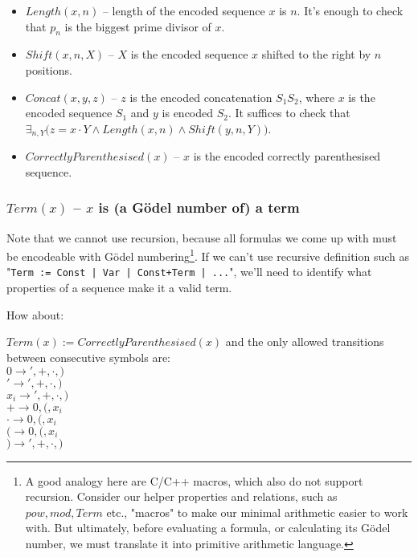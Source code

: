 \documentclass{article}
\begin{document}
\begin{itemize}
    \item $Length(x, n)$ -- length of the encoded sequence $x$ is $n$. It's enough to check that
        $p_n$ is the biggest prime divisor of $x$.
    \item $Shift(x, n, X)$ -- $X$ is the encoded sequence $x$ shifted to the right by $n$ positions.
    \item $Concat(x, y, z)$ -- $z$ is the encoded concatenation $S_1S_2$, where $x$ is the
        encoded sequence $S_1$ and $y$ is encoded $S_2$. It suffices to check that
        $\exists_{n, Y} \bigl( z = x \cdot Y \land Length(x, n) \land Shift(y, n, Y) \bigl)$.
    \item $CorrectlyParenthesised(x)$ -- $x$ is the encoded correctly parenthesised sequence.
\end{itemize}

\subsubsection{$Term(x)$ -- $x$ is (a Gödel number of) a term}

Note that we cannot use recursion, because all formulas
we come up with must be encodeable with Gödel numbering\footnote{
    A good analogy here are C/C++ macros, which also do not support recursion.
    Consider our helper properties and relations, such as $pow, mod, Term$ etc., "macros"
    to make our minimal arithmetic easier to work with. But ultimately, before evaluating
    a formula, or calculating its Gödel number, we must translate it into primitive
    arithmetic language.
}. If we can't use recursive definition such as "\texttt{Term := Const | Var | Const+Term | ...}",
we'll need to identify what properties of a sequence make it a valid term.

How about:
\begin{center}
    $Term(x) := CorrectlyParenthesised(x)$ and the only allowed transitions between consecutive
    symbols are: \\
    $0 \rightarrow ', +, \cdot, )$ \\
    $' \rightarrow ', +, \cdot, )$ \\
    $x_i \rightarrow ', +, \cdot, )$ \\
    $+ \rightarrow 0, (, x_i$ \\
    $\cdot \rightarrow 0, (, x_i$ \\
    $( \rightarrow 0, (, x_i $ \\
    $) \rightarrow ', +, \cdot, ) $ \\
\end{center}
\end{document}
